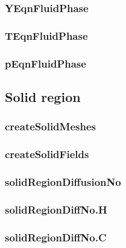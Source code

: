 \subsubsection*{YEqnFluidPhase}

\subsubsection*{TEqnFluidPhase}

\subsubsection*{pEqnFluidPhase}


\subsection{Solid region}
\subsubsection*{createSolidMeshes}

\subsubsection*{createSolidFields}

\subsubsection*{solidRegionDiffusionNo}

\subsubsection*{solidRegionDiffNo.H}

\subsubsection*{solidRegionDiffNo.C}

